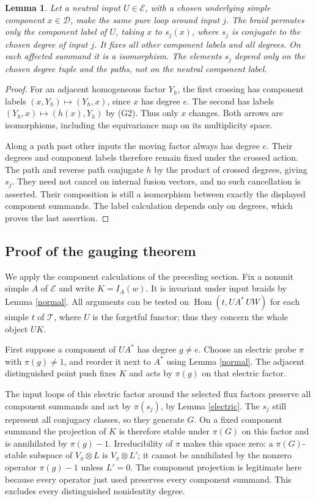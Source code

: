 \documentclass[10pt]{amsart}
\newcommand{\D}{\mathcal D}\newcommand{\E}{\mathcal E}
\newcommand{\Hom}{\operatorname{Hom}}\newcommand{\Irr}{\operatorname{Irr}}
\newtheorem{lemma}[theorem]{Lemma}
\begin{document}
\begin{lemma}\label{neutral}
Let a neutral input $U\in\E$, with a chosen underlying simple
component $x\in\D$, make the same pure loop around input $j$.
The braid permutes only the component label of $U$, taking
$x$ to $s_j(x)$, where $s_j$ is conjugate to the chosen degree
of input $j$. It fixes all other component labels and all
degrees. On each affected summand it is a isomorphism.
The elements $s_j$ depend only on the chosen degree tuple and
the paths, not on the neutral component label.
\end{lemma}
\begin{proof}
For an adjacent homogeneous factor $Y_h$, the first crossing
has component labels $(x,Y_h)\mapsto(Y_h,x)$, since $x$ has
degree $e$. The second has labels
$(Y_h,x)\mapsto(h(x),Y_h)$ by (G2).
Thus only $x$ changes. Both arrows are isomorphisms, including
the equivariance map on its multiplicity space.

Along a path past other inputs the moving factor always
has degree $e$. Their degrees and component labels therefore
remain fixed under the crossed action. The path and reverse
path conjugate $h$ by the product of crossed degrees, giving
$s_j$. They need not cancel on internal fusion vectors,
and no such cancellation is asserted. Their composition is
still a isomorphism between exactly the displayed
component summands. The label calculation depends only on
degrees, which proves the last assertion.
\end{proof}

\subsection{Proof of the gauging theorem}
We apply the component calculations of the preceding section.
Fix a nonunit simple $A$ of $\E$ and write $K=I_A(w)$.
It is invariant under input braids by Lemma \ref{normal}.
All arguments can be tested on $\Hom(t,UA^*\,UW)$ for each
simple $t$ of $\mathcal T$, where $U$ is the forgetful functor;
thus they concern the whole object $UK$.

First suppose a component of $UA^*$ has degree $g\ne e$.
Choose an electric probe $\pi$ with $\pi(g)\ne1$, and
reorder it next to $A^*$ using Lemma \ref{normal}.
The adjacent distinguished point push fixes $K$ and acts
by $\pi(g)$ on that electric factor.

The input loops of this electric factor around the selected
flux factors preserve all component summands and act by
$\pi(s_j)$, by Lemma \ref{electric}. The $s_j$ still represent
all conjugacy classes, so they generate $G$.
On a fixed component summand the projection of $K$ is
therefore stable under $\pi(G)$ on this factor and is
annihilated by $\pi(g)-1$.
Irreducibility of $\pi$ makes this space zero: a
$\pi(G)$-stable subspace of $V_\pi\otimes L$ is
$V_\pi\otimes L'$; it cannot be annihilated by the nonzero
operator $\pi(g)-1$ unless $L'=0$.
The component projection is legitimate here because every
operator just used preserves every component summand.
This excludes every distinguished nonidentity degree.
\end{document}
